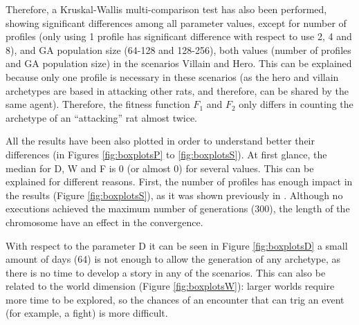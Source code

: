 \documentclass[runningheads,a4paper]{llncs}
\begin{document}
Therefore, a Kruskal-Wallis multi-comparison test has also been
performed, showing significant differences among all parameter values,
except for number of profiles (only using 1 profile has significant
difference with respect to use 2, 4 and 8), and GA population size
(64-128 and 128-256), both values (number of profiles and GA population size) in the scenarios Villain and Hero. This
can be explained because only one profile is necessary in these
scenarios (as the hero and villain archetypes are based in attacking
other rats, and therefore, can be shared by the same agent). Therefore, 
the fitness function $F_1$ and $F_2$ only differs in counting the archetype of an ``attacking'' rat almost twice.  %


All the results have been also plotted in order to understand better
their differences (in Figures \ref{fig:boxplotsP} to \ref{fig:boxplotsS}). At first glance, the median for D, W and F is 0 (or almost 0) for several
values. This can be explained for different reasons. First, the number of profiles has enough impact in the results (Figure \ref{fig:boxplotsS}), as it was shown previously in \cite{garcia14}. Although no executions achieved the maximum number of generations (300), the length of the chromosome have an effect in the convergence. %

With respect to the parameter D it can be seen in Figure \ref{fig:boxplotsD} a small
amount of days (64) is not enough to allow the generation of any
archetype, as there is no time to develop a story in any of the scenarios. This can also be
related to the world dimension (Figure \ref{fig:boxplotsW}): larger worlds require more time to be
explored, so the chances of an encounter that can trig an event (for
example, a fight) is more difficult. 
\end{document}
